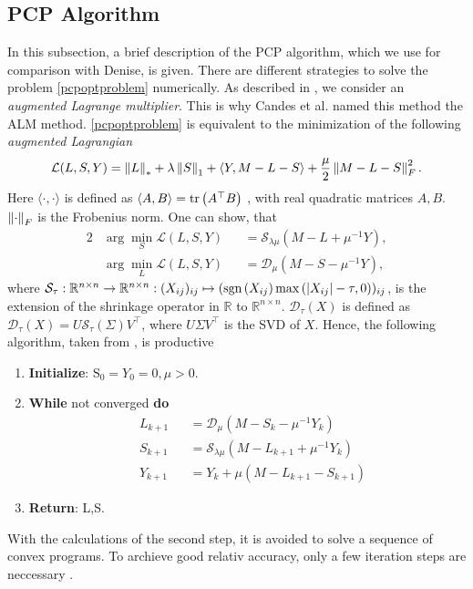 \subsection{PCP Algorithm}\label{sec:pcpalgorithm}
\label{sec:PCP}
In this subsection, a brief description of the PCP algorithm, which we use for comparison with Denise, is given. There are different strategies to solve the problem \eqref{pcpoptproblem} numerically. As described in \cite{candes2009robust}, we consider an \textit{augmented Lagrange multiplier}. This is why Candes et al. named this method the ALM method. \eqref{pcpoptproblem} is equivalent to the minimization of the following \textit{augmented Lagrangian}
\begin{align}
 \mathcal L(L,S,Y) = \left\Vert L\right\Vert_* + \lambda \left\Vert S\right\Vert_1 + \langle Y, M -L - S \rangle + \dfrac{\mu}{2} \left\Vert M - L - S\right\Vert_F^2.
\end{align}
Here $\langle \cdot, \cdot \rangle$ is defined as 
$\langle A , B \rangle = \text{tr}\left(A^\top B\right)$
, with real quadratic matrices $A,B$. $\left\Vert\cdot\right\Vert_F$ is the Frobenius norm. One can show, that
\begin{alignat}{2}
 &\arg \min_S \mathcal L(L,S,Y) &&= \mathcal S_{\lambda \mu}(M-L+ \mu^{-1} Y), \\
 &\arg \min_L \mathcal L(L,S,Y) &&= \mathcal D_\mu (M-S-\mu^{-1} Y),
\end{alignat}
where $\mathcal S_\tau : \mathbb R^{n \times n} \to \mathbb R^{n \times n}: (X_{ij})_{ij} \mapsto (\text{sgn}\left(X_{ij}\right) \max \left( \lvert X_{ij} \rvert - \tau,0 \right))_{ij}$, is the extension of the shrinkage operator in $\mathbb R$ to $\mathbb R^{n \times n}$. $\mathcal D_\tau (X)$ is defined as $\mathcal D_\tau (X) = U \mathcal S_\tau (\Sigma) V^\top$, where $U \Sigma V^\top$ is the SVD of $X$. Hence, the following algorithm, taken from \cite[29]{candes2009robust}, is productive
\begin{enumerate}
 \item \textbf{Initialize}: $\mathrm S_0 = Y_0 = 0,\mu >0$.
 \item \textbf{While} not converged \textbf{do}
    \begin{subequations}
    \begin{alignat}{2}
     &L_{k+1} &&= \mathcal D_\mu(M-S_k-\mu^{-1} Y_k) \\
     &S_{k+1} &&= \mathcal S_{\lambda \mu}(M-L_{k+1} +\mu^{-1} Y_k) \\
     &Y_{k+1} &&= Y_k + \mu(M-L_{k+1} - S_{k+1})
    \end{alignat}
    \end{subequations}
 \item \textbf{Return}: L,S.
\end{enumerate}
With the calculations of the second step, it is avoided to solve a sequence of convex programs. To archieve good relativ accuracy, only a few iteration steps are neccessary \cite[section 3]{candes2009robust}.

